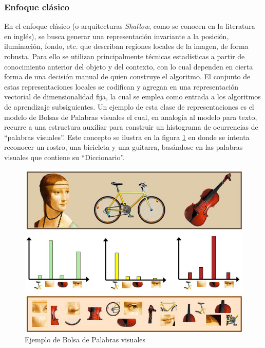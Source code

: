 \documentclass[a4paper,11pt,spanish]{book}
\begin{document}
      \subsubsection{Enfoque clásico}
	En el enfoque clásico (o arquitecturas \emph{Shallow}, como se conocen en la literatura en inglés), se busca generar una representación invariante a la posición, iluminación, 
	fondo, etc. que describan regiones locales de la imagen, de forma robusta. 
	Para ello se utilizan principalmente técnicas estadísticas a partir de conocimiento anterior del objeto y del contexto,
	con lo cual dependen en cierta forma de una decisión manual de quien construye el algoritmo.
	El conjunto de estas representaciones locales se codifican y agregan en una representación vectorial de dimensionalidad fija, la cual se emplea como
        entrada a los algoritmos de aprendizaje subsiguientes. 
        Un ejemplo de esta clase de representaciones es el modelo de Bolsas de Palabras visuales el cual, en analogía al modelo para texto, 
        recurre a una estructura auxiliar para construir un histograma de ocurrencias de ``palabras visuales''. 
        Este concepto se ilustra en la figura \ref{fig:bovw} en donde se intenta reconocer un rostro, una bicicleta y una guitarra, basándose en las 
        palabras visuales que contiene su ``Diccionario''.

	\begin{figure}[h]
	  \begin{center}
	    \includegraphics[scale=0.5]{./img/bag_of_visual_words.jpg}
	    \caption{Ejemplo de Bolsa de Palabras visuales}
	    \label{fig:bovw}
	  \end{center}
	\end{figure}
\end{document}
